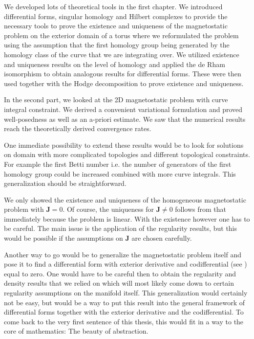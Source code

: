 \documentclass[../master_thesis.tex]{subfiles}
\begin{document}
We developed lots of theoretical tools in the first chapter. We introduced 
differential forms, singular homology and Hilbert complexes to provide the 
necessary tools to prove the existence and uniqueness of the magnetostatic 
problem on the exterior domain of a torus where we reformulated the problem 
using the assumption that the first homology group being generated by the homology class 
of the curve that we are integrating over. We utilized existence and uniqueness results 
on the level of homology and applied the de Rham isomorphism to obtain analogous 
results for differential forms. These were then used together with the Hodge 
decomposition to prove existence and uniqueness.

In the second part, we looked at the 2D magnetostatic problem with curve integral 
constraint. We derived a convenient variational formulation and 
proved well-posedness as well as an a-priori estimate. We saw that the numerical results reach the 
theoretically derived convergence rates. 

One immediate possibility to extend these results would be to look for solutions on domain with more complicated 
topologies and different topological constraints. For example the first Betti number 
i.e. the number of generators of the first homology group could be increased
combined with more curve integrals. This generalization should be 
straightforward. 

We only showed the existence and uniqueness of the homogeneous magnetostatic problem 
with $\mathbf{J}=0$. Of course, the uniqueness for $\mathbf{J} \neq 0$ follows from 
that immediately because the problem is linear. With the existence however 
one has to be careful. The main issue is the application of the regularity results, but 
this would be possible if the assumptions on $\mathbf{J}$ are chosen carefully.

Another way to go would be to generalize the magnetostatic problem itself 
and pose it to find a differential form with exterior derivative and codifferential 
(see \cite[Sec.\,6.2.6]{arnold})
equal to zero.
One would have to be careful 
then to obtain the regularity and density results that we relied on which 
will most likely come down to certain regularity assumptions on the manifold itself.
This generalization would certainly not be easy, but would be a way to put 
this result into the general framework of differential forms together with 
the exterior derivative and the codifferential. To come back to the very
first sentence of this thesis, this would fit in a way to the core of 
mathematics: The beauty of abstraction.
\end{document}
